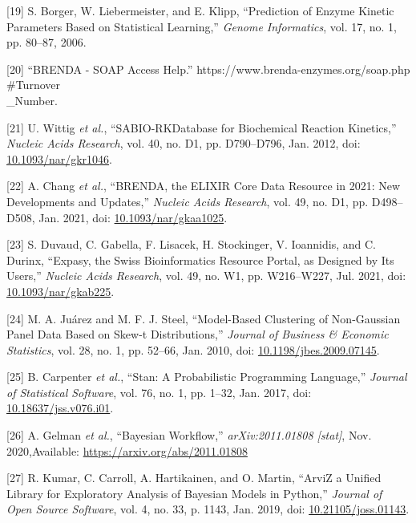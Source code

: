 \documentclass[11pt]{article}
\begin{document}
\hypertarget{citeproc_bib_item_19}{[19] S. Borger, W. Liebermeister, and E. Klipp, “Prediction of Enzyme Kinetic Parameters Based on Statistical Learning,” \textit{Genome Informatics}, vol. 17, no. 1, pp. 80–87, 2006.}

\hypertarget{citeproc_bib_item_20}{[20] “BRENDA - SOAP Access Help.” https://www.brenda-enzymes.org/soap.php\\#Turnover\\_Number.}

\hypertarget{citeproc_bib_item_21}{[21] U. Wittig \textit{et al.}, “SABIO-RK\textemdash Database for Biochemical Reaction Kinetics,” \textit{Nucleic Acids Research}, vol. 40, no. D1, pp. D790–D796, Jan. 2012, doi: \href{https://doi.org/10.1093/nar/gkr1046}{10.1093/nar/gkr1046}.}

\hypertarget{citeproc_bib_item_22}{[22] A. Chang \textit{et al.}, “BRENDA, the ELIXIR Core Data Resource in 2021: New Developments and Updates,” \textit{Nucleic Acids Research}, vol. 49, no. D1, pp. D498–D508, Jan. 2021, doi: \href{https://doi.org/10.1093/nar/gkaa1025}{10.1093/nar/gkaa1025}.}

\hypertarget{citeproc_bib_item_23}{[23] S. Duvaud, C. Gabella, F. Lisacek, H. Stockinger, V. Ioannidis, and C. Durinx, “Expasy, the Swiss Bioinformatics Resource Portal, as Designed by Its Users,” \textit{Nucleic Acids Research}, vol. 49, no. W1, pp. W216–W227, Jul. 2021, doi: \href{https://doi.org/10.1093/nar/gkab225}{10.1093/nar/gkab225}.}

\hypertarget{citeproc_bib_item_24}{[24] M. A. Juárez and M. F. J. Steel, “Model-Based Clustering of Non-Gaussian Panel Data Based on Skew-t Distributions,” \textit{Journal of Business \& Economic Statistics}, vol. 28, no. 1, pp. 52–66, Jan. 2010, doi: \href{https://doi.org/10.1198/jbes.2009.07145}{10.1198/jbes.2009.07145}.}

\hypertarget{citeproc_bib_item_25}{[25] B. Carpenter \textit{et al.}, “Stan: A Probabilistic Programming Language,” \textit{Journal of Statistical Software}, vol. 76, no. 1, pp. 1–32, Jan. 2017, doi: \href{https://doi.org/10.18637/jss.v076.i01}{10.18637/jss.v076.i01}.}

\hypertarget{citeproc_bib_item_26}{[26] A. Gelman \textit{et al.}, “Bayesian Workflow,” \textit{arXiv:2011.01808 [stat]}, Nov. 2020,Available: \href{https://arxiv.org/abs/2011.01808}{https://arxiv.org/abs/2011.01808}}

\hypertarget{citeproc_bib_item_27}{[27] R. Kumar, C. Carroll, A. Hartikainen, and O. Martin, “ArviZ a Unified Library for Exploratory Analysis of Bayesian Models in Python,” \textit{Journal of Open Source Software}, vol. 4, no. 33, p. 1143, Jan. 2019, doi: \href{https://doi.org/10.21105/joss.01143}{10.21105/joss.01143}.}
\end{document}
